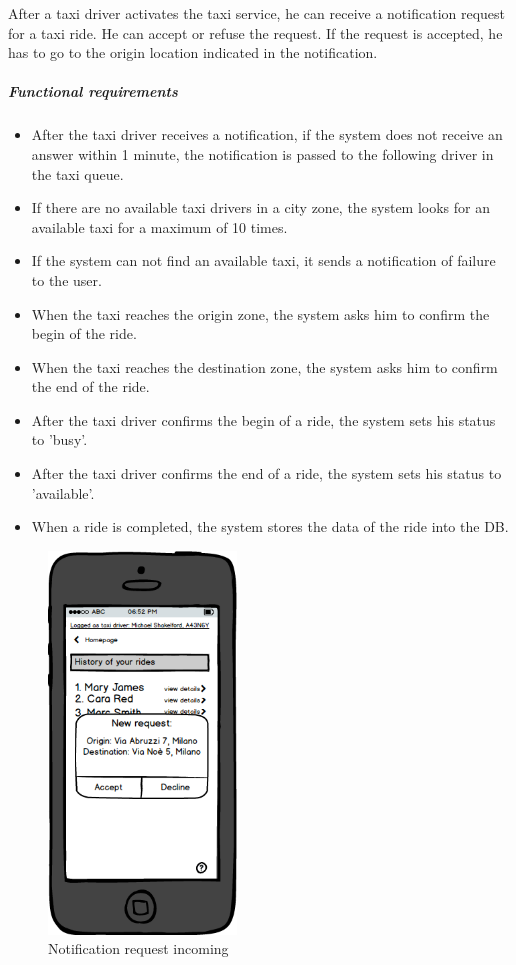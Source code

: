 After a taxi driver activates the taxi service, he can receive a notification request for a taxi ride. He can accept or refuse the request. If the request is accepted, he has to go to the origin location indicated in the notification.


\subparagraph{Functional requirements}
\noindent
    \begin{itemize}
        \item After the taxi driver receives a notification, if the system does not receive an answer within 1 minute, the notification is passed to the following driver in the taxi queue.
        \item If there are no available taxi drivers in a city zone, the system looks for an available taxi for a maximum of 10 times. 
        \item If the system can not find an available taxi, it sends a notification of failure to the user.
        \item When the taxi reaches the origin zone, the system asks him to confirm the begin of the ride.
        \item When the taxi reaches the destination zone, the system asks him to confirm the end of the ride.
        \item After the taxi driver confirms the begin of a ride, the system sets his status to 'busy'.
        \item After the taxi driver confirms the end of a ride, the system sets his status to 'available'.
        \item When a ride is completed, the system stores the data of the ride into the DB.
    \end{itemize}
    
\begin{figure}[H]
    \centering
    \includegraphics[width=5cm]{./Mockups/RequestHandling.png}
    \caption{Notification request incoming}
\end{figure}
